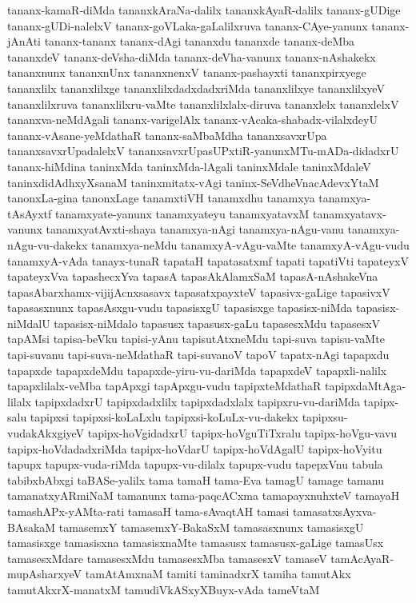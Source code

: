 {tananx-kamaR-diMda
tananxkAraNa-dalilx
tananxkAyaR-dalilx
tananx-gUDige
tananx-gUDi-nalelxV
tananx-goVLaka-gaLalilxruva
tananx-CAye-yanunx
tananx-jAnAti
tananx-tananx
tananx-dAgi
tananxdu
tananxde
tananx-deMba
tananxdeV
tananx-deVsha-diMda
tananx-deVha-vanunx
tananx-nAshakekx
tananxnunx
tananxnUnx
tananxnenxV
tananx-pashayxti
tananxpirxyege
tananxlilx
tananxlilxge
tananxlilxdadxdadxriMda
tananxlilxye
tananxlilxyeV
tananxlilxruva
tananxlilxru-vaMte
tananxlilxlalx-diruva
tananxlelx
tananxlelxV
tananxva-neMdAgali
tananx-varigelAlx
tananx-vAcaka-shabadx-vilalxdeyU
tananx-vAsane-yeMdathaR
tananx-saMbaMdha
tananxsavxrUpa
tananxsavxrUpadalelxV
tananxsavxrUpasUPxtiR-yanunxMTu-mADa-didadxrU
tananx-hiMdina
taninxMda
taninxMda-lAgali
taninxMdale
taninxMdaleV
taninxdidAdhxyXsanaM
taninxmitatx-vAgi
taninx-SeVdheVnacAdevxYtaM
tanonxLa-gina
tanonxLage
tanamxtiVH
tanamxdhu
tanamxya
tanamxya-tAsAyxtf
tanamxyate-yanunx
tanamxyateyu
tanamxyatavxM
tanamxyatavx-vanunx
tanamxyatAvxti-shaya
tanamxya-nAgi
tanamxya-nAgu-vanu
tanamxya-nAgu-vu-dakekx
tanamxya-neMdu
tanamxyA-vAgu-vaMte
tanamxyA-vAgu-vudu
tanamxyA-vAda
tanayx-tunaR
tapataH
tapatasatxmf
tapati
tapatiVti
tapateyxV
tapateyxVva
tapashecxYva
tapasA
tapasAkAlamxSaM
tapasA-nAshakeVna
tapasAbarxhamx-vijijAcnxsasavx
tapasatxpayxteV
tapasivx-gaLige
tapasivxV
tapasasxnunx
tapasAsxgu-vudu
tapasisxgU
tapasisxge
tapasisx-niMda
tapasisx-niMdalU
tapasisx-niMdalo
tapasusx
tapasusx-gaLu
tapasesxMdu
tapasesxV
tapAMsi
tapisa-beVku
tapisi-yAnu
tapisutAtxneMdu
tapi-suva
tapisu-vaMte
tapi-suvanu
tapi-suva-neMdathaR
tapi-suvanoV
tapoV
tapatx-nAgi
tapapxdu
tapapxde
tapapxdeMdu
tapapxde-yiru-vu-dariMda
tapapxdeV
tapapxli-nalilx
tapapxlilalx-veMba
tapApxgi
tapApxgu-vudu
tapipxteMdathaR
tapipxdaMtAga-lilalx
tapipxdadxrU
tapipxdadxlilx
tapipxdadxlalx
tapipxru-vu-dariMda
tapipx-salu
tapipxsi
tapipxsi-koLaLxlu
tapipxsi-koLuLx-vu-dakekx
tapipxsu-vudakAkxgiyeV
tapipx-hoVgidadxrU
tapipx-hoVguTiTxralu
tapipx-hoVgu-vavu
tapipx-hoVdadadxriMda
tapipx-hoVdarU
tapipx-hoVdAgalU
tapipx-hoVyitu
tapupx
tapupx-vuda-riMda
tapupx-vu-dilalx
tapupx-vudu
tapepxVnu
tabula
tabibxbAbxgi
taBASe-yalilx
tama
tamaH
tama-Eva
tamagU
tamage
tamanu
tamanatxyARmiNaM
tamanunx
tama-paqcACxma
tamapayxnuhxteV
tamayaH
tamashAPx-yAMta-rati
tamasaH
tama-sAvaqtAH
tamasi
tamasatxsAyxva-BAsakaM
tamasemxY
tamasemxY-BakaSxM
tamasasxnunx
tamasisxgU
tamasisxge
tamasisxna
tamasisxnaMte
tamasusx
tamasusx-gaLige
tamasUsx
tamasesxMdare
tamasesxMdu
tamasesxMba
tamasesxV
tamaseV
tamAcAyaR-mupAsharxyeV
tamAtAmxnaM
tamiti
taminadxrX
tamiha
tamutAkx
tamutAkxrX-manatxM
tamudiVkASxyXBuyx-vAda
tameVtaM
}
